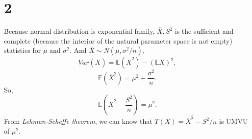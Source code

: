 \documentclass[en,12pt]{elegantpaper}
\begin{document}
    \section*{2}
    \noindent Because normal distribution is exponential family, $\bar{X}, S^2$ is the sufficient and complete (because the interior of the natural parameter space is not empty) statistics for $\mu$ and $\sigma^2$. And $\bar{X}\sim N(\mu, \sigma^2/n)$, 
    \[
        Var(\bar{X})=\mathbb{E}(\bar{X}^2)-(\mathbb{E}X)^2, 
    \]
    \[
        \mathbb{E}(\bar{X}^2)=\mu^2+\frac{\sigma^2}{n}. 
    \]
    So, \[
        \mathbb{E}\left(\bar{X}^2-\frac{S^2}{n}\right)=\mu^2. 
    \]
    From \emph{Lehman-Scheffe theorem}, we can know that $T(X)=\bar{X}^2-S^2/n$ is UMVU of $\mu^2$. 
\end{document}
